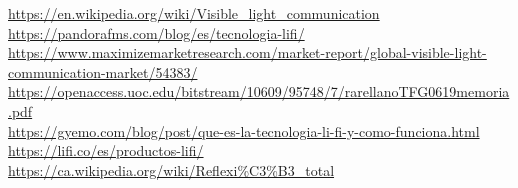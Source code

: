 
 \url{https://en.wikipedia.org/wiki/Visible_light_communication}
 \\
 \url{https://pandorafms.com/blog/es/tecnologia-lifi/}
 \\
 \url{https://www.maximizemarketresearch.com/market-report/global-visible-light-communication-market/54383/}
 \\
 \url{https://openaccess.uoc.edu/bitstream/10609/95748/7/rarellanoTFG0619memoria.pdf}
 \\
\url{https://gyemo.com/blog/post/que-es-la-tecnologia-li-fi-y-como-funciona.html}
\\
\url{https://lifi.co/es/productos-lifi/}
\\
\url{https://ca.wikipedia.org/wiki/Reflexi%C3%B3_total}